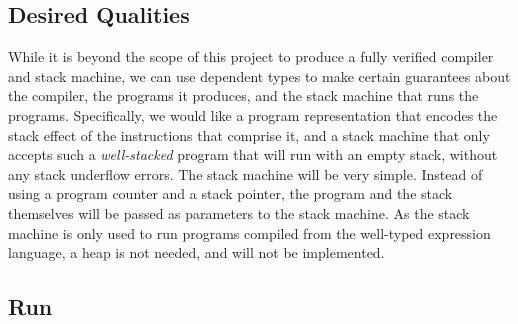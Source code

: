 \subsection{Desired Qualities}
While it is beyond the scope of this project to produce a fully verified compiler and stack machine, we can use dependent types to make certain guarantees about the compiler, the programs it produces, and the stack machine that runs the programs. Specifically, we would like a program representation that encodes the stack effect of the instructions that comprise it, and a stack machine that only accepts such a \textit{well-stacked} program that will run with an empty stack, without any stack underflow errors. The stack machine will be very simple. Instead of using a program counter and a stack pointer, the program and the stack themselves will be passed as parameters to the stack machine. As the stack machine is only used to run programs compiled from the well-typed expression language, a heap is not needed, and will not be implemented.



\subsection{Run}
\label{sec:running_a_program}
